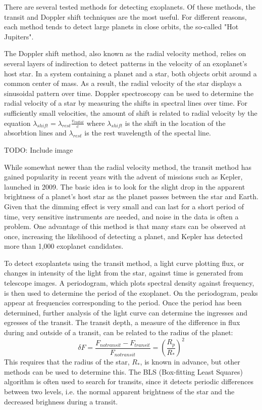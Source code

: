 There are several tested methods for detecting exoplanets. Of these methods, the transit and Doppler
shift techniques are the most useful. For different reasons, each method tends to detect large planets
in close orbits, the so-called "Hot Jupiters".

The Doppler shift method, also known as the radial velocity method, relies on several layers of indirection
to detect patterns in the velocity of an exoplanet's host star. In a system containing a planet and a star,
both objects orbit around a common center of mass.\autocite{jplMethods} As a result, the radial velocity
of the star displays a sinusoidal pattern over time. Doppler spectroscopy can be used to determine the radial
velocity of a star by measuring the shifts in spectral lines over time. For sufficiently small velocities,
the amount of shift is related to radial velocity by the equation
\( \lambda_{shift} = \lambda_{rest} \frac{v_{radial}}{c} \)
where \(\lambda_{shift}\) is the shift in the location of the absorbtion lines and
\(\lambda_{rest}\) is the rest wavelength of the spectal line.\autocite{dopplerSpectroscopy}

TODO: Include image

While somewhat newer than the radial velocity method, the transit method has gained popularity in recent years
with the advent of missions such as Kepler, launched in 2009. The basic idea is to look for the slight drop
in the apparent brightness of a planet's host star as the planet passes between the star and Earth. Given that the
dimming effect is very small and can last for a short period of time, very sensitive instruments are needed,
and noise in the data is often a problem.\autocite{jplMethods} One advantage of this method is that
many stars can be observed at once, increasing the likelihood of detecting a planet, and Kepler
has detected more than 1,000 exoplanet candidates.\autocite{jplMethods}

To detect exoplantets using the transit method, a light curve plotting flux, or changes in intensity of the
light from the star, against time is generated from telescope images. A periodogram, which plots spectral density against frequency,
is then used to determine the period of the exoplanet. On the periodogram, peaks appear at frequencies corresponding
to the period. Once the period has been determined, further analysis of the light curve can determine the ingresses
and egresses of the transit. The transit depth, a measure of the difference in flux during and outside of a transit,
can be related to the radius of the planet:
\begin{displaymath}
	\delta F = \frac{F_{no transit} - F_{transit}}{F_{no transit}} = (\frac{R_p}{R_*})^2
\end{displaymath}
This requires that the radius of the star, \(R_*\), is known in advance, but other methods can be used to determine this.
The BLS (Box-fitting Least Squares) algorithm is often used to search for transits, since it detects periodic differences
between two levels, i.e. the normal apparent brightness of the star and the decreased brighness during a transit.\autocite{bls}

